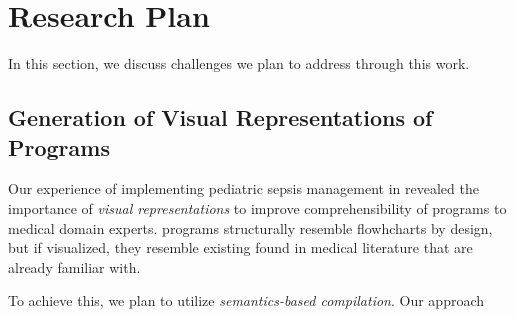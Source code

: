 \section{Research Plan}

In this section, we discuss challenges we plan to address through this work.

\subsection{Generation of Visual Representations of \MediK{} Programs}

Our experience of implementing pediatric sepsis management in \MediK{}
revealed the importance of \emph{visual representations} to improve
comprehensibility of \MediK{} programs to medical domain experts.
\MediK{} programs structurally resemble flowhcharts by design, but
if visualized, they resemble existing \BPGs{} found in medical
literature that \HCPs{} are already familiar with.

To achieve this, we plan to utilize \emph{semantics-based compilation}.
Our approach
